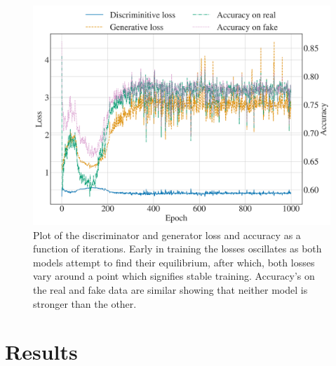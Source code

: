 \documentclass[12pt]{iopart}
\begin{document}
\begin{figure}[h!]
    \centering
    \includegraphics[width=1\textwidth]{figures/losses.png}
    \caption{Plot of the discriminator and generator loss and accuracy as a function of iterations. Early in training the losses oscillates as both models attempt to find their equilibrium, after which, both losses vary around a point which signifies stable training. Accuracy's on the real and fake data are similar showing that neither model is stronger than the other.}
    \label{fig:lossplot}
\end{figure}

\section{Results}

\end{document}
